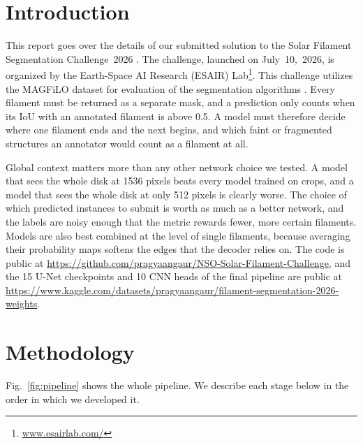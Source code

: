 \documentclass[sigconf]{acmart}
\begin{document}
\section{Introduction}
    This report goes over the details of our submitted solution to the Solar Filament Segmentation Challenge~2026 \cite{filament-segmentation-2026}. The challenge, launched on July~10,~2026, is organized by the Earth-Space AI Research (ESAIR) Lab\footnote{\href{https://www.esairlab.com/home}{www.esairlab.com/}}. This challenge utilizes the MAGFiLO dataset for evaluation of the segmentation algorithms \cite{ahmadzadeh2024dataset}. Every filament must be returned as a separate mask, and a prediction only counts when its IoU with an annotated filament is above 0.5. A model must therefore decide where one filament ends and the next begins, and which faint or fragmented structures an annotator would count as a filament at all.

Global context matters more than any other network choice we tested. A model that sees the whole disk at 1536 pixels beats every model trained on crops, and a model that sees the whole disk at only 512 pixels is clearly worse. The choice of which predicted instances to submit is worth as much as a better network, and the labels are noisy enough that the metric rewards fewer, more certain filaments. Models are also best combined at the level of single filaments, because averaging their probability maps softens the edges that the decoder relies on. The code is public at \url{https://github.com/pragyaangaur/NSO-Solar-Filament-Challenge}, and the 15 U-Net checkpoints and 10 CNN heads of the final pipeline are public at \url{https://www.kaggle.com/datasets/pragyaangaur/filament-segmentation-2026-weights}.


\section{Methodology}\label{sec:methodology}

Fig.~\ref{fig:pipeline} shows the whole pipeline. We describe each stage below in the order in which we developed it.
\end{document}
